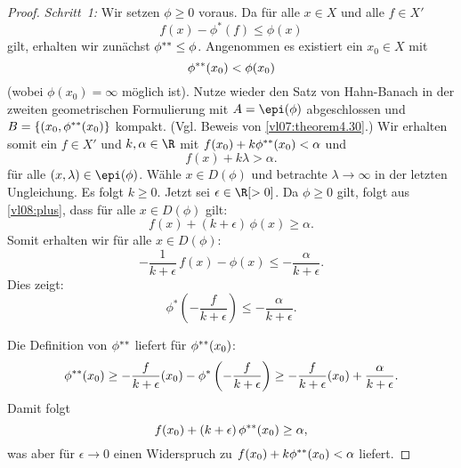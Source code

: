 \begin{proof}
    \emph{Schritt~1:} Wir setzen $\phi \geq 0$ voraus. Da für alle $x\in X$ und
    alle $f\in X'$
    \[ f(x) - \phi^\ast(f) \leq \phi(x) \]
    gilt, erhalten wir zunächst $\phi^{\ast\ast} \leq \phi$. Angenommen es
    existiert ein $x_0\in X$ mit \[ \phi^{\ast\ast}(x_0) < \phi(x_0) \]  (wobei
    $\phi(x_0)=\infty$ möglich ist). Nutze wieder den Satz von Hahn-Banach in
    der zweiten geometrischen Formulierung  mit
    $A=\epi(\phi)$ abgeschlossen und $B=\{(x_0,\phi^{\ast\ast}(x_0)\}$ kompakt. 
    (Vgl. Beweis von \cref{vl07:theorem4.30}.) Wir erhalten somit ein
    $f\in X'$ und $k,\alpha\in\R$ mit $f(x_0) + k\phi^{\ast\ast}(x_0) < \alpha$
    und
    \[ \tag{$\diamond$} \label{vl08:plus}
        f(x) + k\lambda > \alpha  . \]
    für alle $(x,\lambda)\in\epi(\phi)$.  Wähle $x\in D(\phi)$ und betrachte
    $\lambda\to\infty$ in der letzten Ungleichung. Es folgt $k\geq 0$. Jetzt
    sei $\epsilon\in\R[>0]$. Da $\phi\geq 0$ gilt, folgt aus 
    \eqref{vl08:plus}, dass für alle $x\in D(\phi)$ gilt:
    \[ f(x) + (k+\epsilon)\, \phi(x) \geq \alpha  . \]
    Somit erhalten wir für alle $x\in D(\phi)$:
    \[ -\frac{1}{k+\epsilon}\,f(x) - \phi(x) \leq -\frac{\alpha}{k+\epsilon} 
    . \]
    Dies zeigt:
    \[ \phi^\ast\left( -\frac{f}{k+\epsilon} \right) \leq
        -\frac{\alpha}{k+\epsilon}
    . \]

    Die Definition von $\phi^{\ast\ast}$ liefert für $\phi^{\ast\ast}(x_0)$:
    \[ \phi^{\ast\ast}(x_0)
        \geq -\frac{f}{k+\epsilon}(x_0) 
        - \phi^\ast\left( -\frac{f}{k+\epsilon} \right)
        \geq -\frac{f}{k+\epsilon}(x_0) + \frac{\alpha}{k+\epsilon}
    . \]
    Damit folgt
    \[ f(x_0) + (k+\epsilon)\,\phi^{\ast\ast}(x_0) \geq \alpha , \]
    was aber für $\epsilon\to0$ einen Widerspruch zu $f(x_0) + k\phi^{\ast\ast}(x_0) < \alpha$
    liefert.
    

\end{proof}
